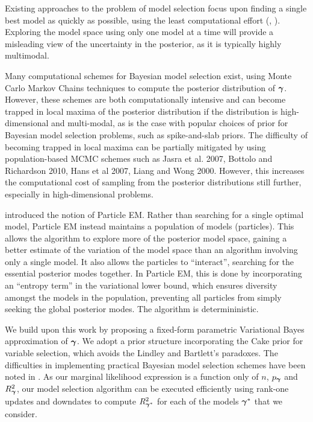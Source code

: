 Existing approaches to the problem of model selection focus upon finding a single best model as quickly as
possible, using the least computational effort (\cite{You2014}, \cite{Rockova2014}). Exploring the model space
using only one model at a time will provide a misleading view of the uncertainty in the posterior, as it is
typically highly multimodal.

Many computational schemes for Bayesian model selection exist, using Monte Carlo Markov Chains techniques to
compute the posterior distribution of ${\boldsymbol \gamma}$. However, these schemes are both computationally intensive and
can become trapped in local maxima of the posterior distribution if the distribution is high-dimensional and
multi-modal, as is the case with popular choices of prior for Bayesian model selection problems, such as
spike-and-slab priors. The difficulty of becoming trapped in local maxima can be partially mitigated by using
population-based MCMC schemes such as Jasra et al. 2007, Bottolo and Richardson 2010, Hans et al 2007, Liang
and Wong 2000. However, this increases the computational cost of sampling from the posterior distributions
still further, especially in high-dimensional problems.

\cite{Rockova2016} introduced the notion of Particle EM. Rather than searching for a single optimal model,
Particle EM instead maintains a population of models (particles). This allows the algorithm to explore more of
the posterior model space, gaining a better estimate of the variation of the model space than an algorithm
involving only a single model. It also allows the particles to ``interact'', searching for the essential
posterior modes together. In Particle EM, this is done by incorporating an ``entropy term'' in the variational
lower bound, which ensures diversity amongst the models in the population, preventing all particles from
simply seeking the global posterior modes. The algorithm is determininistic.

We build upon this work by proposing a fixed-form parametric Variational Bayes approximation of ${\boldsymbol \gamma}$. We
adopt a prior structure incorporating the Cake prior for variable selection, which avoids the Lindley and
Bartlett's paradoxes. The difficulties in implementing practical Bayesian model selection schemes have been
noted in \cite{Chipman2014}. As our marginal likelihood expression is a function only of $n$, $p_{\boldsymbol \gamma}$ and
$R^2_{\boldsymbol \gamma}$, our model selection algorithm can be executed efficiently using rank-one updates and downdates
to compute $R^2_{{\boldsymbol \gamma}^*}$ for each of the models ${\boldsymbol \gamma}^*$ that we consider.

